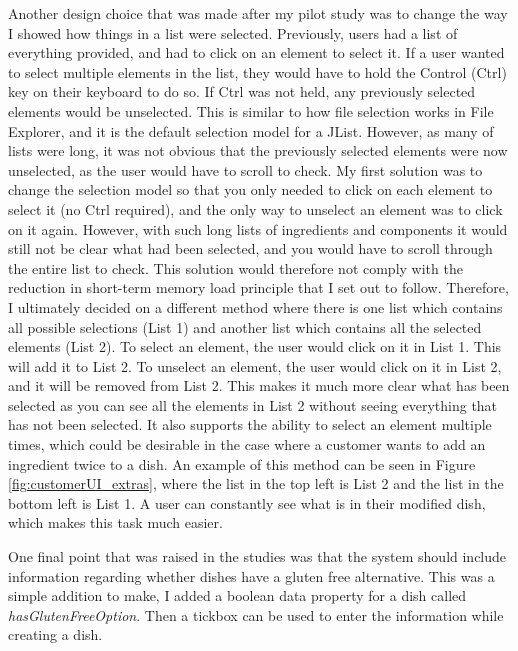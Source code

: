 Another design choice that was made after my pilot study was to change the way I showed how things in a list were selected. Previously, users had a list of everything provided, and had to click on an element to select it. If a user wanted to select multiple elements in the list, they would have to hold the Control (Ctrl) key on their keyboard to do so. If Ctrl was not held, any previously selected elements would be unselected. This is similar to how file selection works in File Explorer, and it is the default selection model for a JList. However, as many of lists were long, it was not obvious that the previously selected elements were now unselected, as the user would have to scroll to check. My first solution was to change the selection model so that you only needed to click on each element to select it (no Ctrl required), and the only way to unselect an element was to click on it again. However, with such long lists of ingredients and components it would still not be clear what had been selected, and you would have to scroll through the entire list to check. This solution would therefore not comply with the reduction in short-term memory load principle that I set out to follow. Therefore, I ultimately decided on a different method where there is one list which contains all possible selections (List 1) and another list which contains all the selected elements (List 2). To select an element, the user would click on it in List 1. This will add it to List 2. To unselect an element, the user would click on it in List 2, and it will be removed from List 2. This makes it much more clear what has been selected as you can see all the elements in List 2 without seeing everything that has not been selected. It also supports the ability to select an element multiple times, which could be desirable in the case where a customer wants to add an ingredient twice to a dish. An example of this method can be seen in Figure \ref{fig:customerUI_extras}, where the list in the top left is List 2 and the list in the bottom left is List 1. A user can constantly see what is in their modified dish, which makes this task much easier.

One final point that was raised in the studies was that the system should include information regarding whether dishes have a gluten free alternative. This was a simple addition to make, I added a boolean data property for a dish called \textit{hasGlutenFreeOption}. Then a tickbox can be used to enter the information while creating a dish.

